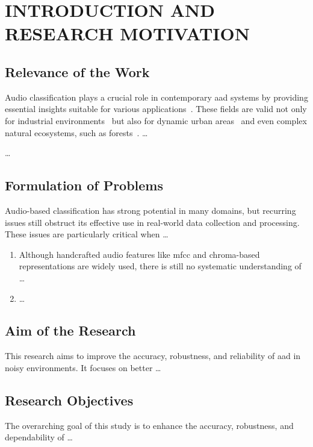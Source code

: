 \section*{\MakeUppercase{Introduction and Research Motivation}}\label{chap:intro}
\glsresetall
{}
\subsection*{Relevance of the Work}\label{subsec:relevance}
Audio classification plays a crucial role in contemporary \gls{aad} systems by providing {essential insights}\label{rev:ru_min_1a} suitable for various applications~\citep{Kilickaya2025, LoScudo2023, Barusco2025}. These fields are valid not only for industrial environments~\citep{Purohit2019} but also for dynamic urban areas~\citep{Piczak2015, Salamon2014} and even complex natural ecosystems, such as forests~\citep{Bandara2023}. \dots

\dots

\subsection*{Formulation of Problems}\label{sec:form_prob}
Audio-based classification has strong potential in many domains, but recurring issues still obstruct its effective use in real-world data collection and processing. These issues are particularly critical when \dots

\begin{enumerate}[leftmargin=*]
	\item Although handcrafted audio features like \gls{mfcc} and chroma-based representations are widely used, there is still no systematic understanding of \dots
	\item \dots
\end{enumerate}

\subsection*{Aim of the Research}\label{sec:aim}
{This research aims to improve the accuracy, robustness, and reliability of \gls{aad} in noisy environments. It focuses on better \dots}

\subsection*{Research Objectives}\label{sec:r_o}
The overarching goal of this study is to enhance the accuracy, robustness, and dependability of \dots

